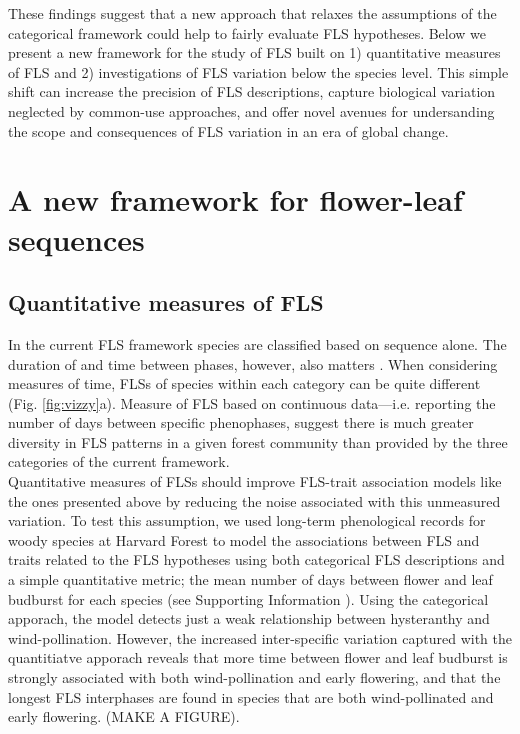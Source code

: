 \documentclass[11pt]{article}
\begin{document}
{\noindent These findings suggest that a new approach that relaxes the assumptions of the categorical framework could help to fairly evaluate FLS hypotheses. Below we present a new framework for the study of FLS built on 1) quantitative measures of FLS and 2) investigations of FLS variation below the species level. This simple shift can increase the precision of FLS descriptions, capture biological variation neglected by common-use approaches, and offer novel avenues for undersanding the scope and consequences of FLS variation in an era of global change.

 
\section*{A new framework for flower-leaf sequences} 

\subsection*{Quantitative measures of FLS}

\noindent In the current FLS framework species are classified based on sequence alone. The duration of and time between phases, however, also matters \citep{Inouye2019}. When considering measures of time, FLSs of species within each category can be quite different (Fig. \ref{fig:vizzy}a). Measure of FLS based on continuous data---i.e. reporting the number of days between specific phenophases, suggest there is much greater diversity in FLS patterns in a given forest community than provided by the three categories of the current framework.\\ 

\noindent  Quantitative measures of FLSs should improve FLS-trait association models like the ones presented above by reducing the noise associated with this unmeasured variation. To test this assumption, we used long-term phenological records for woody species at Harvard Forest \citep{OKeefe2015} to model the associations between FLS and traits related to the FLS hypotheses using both categorical FLS descriptions and a simple quantitative metric; the mean number of days between flower and leaf budburst for each species (see Supporting Information ). Using the categorical apporach, the model detects just a weak relationship between hysteranthy and wind-pollination. However, the increased inter-specific variation captured with the quantitiatve apporach reveals that more time between flower and leaf budburst is strongly associated with both wind-pollination and early flowering, and that the longest FLS interphases are found in species that are both wind-pollinated and early flowering. (MAKE A FIGURE).

}
\end{document}

